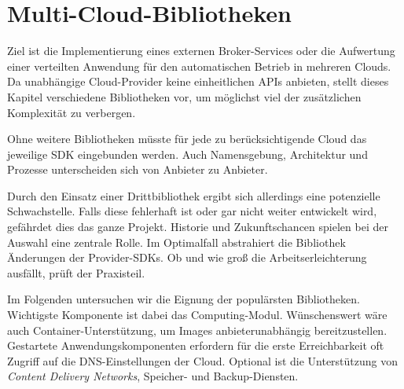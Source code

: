 \section{Multi-Cloud-Bibliotheken}
\label{sec:bibliotheken}

Ziel ist die Implementierung eines externen Broker-Services oder die Aufwertung einer verteilten Anwendung für den automatischen Betrieb in mehreren Clouds. Da unabhängige Cloud-Provider keine einheitlichen APIs anbieten, stellt dieses Kapitel verschiedene Bibliotheken vor, um möglichst viel der zusätzlichen Komplexität zu verbergen.

Ohne weitere Bibliotheken müsste für jede zu berücksichtigende Cloud das jeweilige SDK eingebunden werden. Auch Namensgebung, Architektur und Prozesse unterscheiden sich von Anbieter zu Anbieter. 

Durch den Einsatz einer Drittbibliothek ergibt sich allerdings eine potenzielle Schwachstelle. Falls diese fehlerhaft ist oder gar nicht weiter entwickelt wird, gefährdet dies das ganze Projekt. Historie und Zukunftschancen spielen bei der Auswahl eine zentrale Rolle. Im Optimalfall abstrahiert die Bibliothek Änderungen der Provider-SDKs. Ob und wie groß die Arbeitserleichterung ausfällt, prüft der Praxisteil.

Im Folgenden untersuchen wir die Eignung der populärsten Bibliotheken. Wichtigste Komponente ist dabei das Computing-Modul. Wünschenswert wäre auch Container-Unterstützung, um Images anbieterunabhängig bereitzustellen. Gestartete Anwendungskomponenten erfordern für die erste Erreichbarkeit oft Zugriff auf die DNS-Einstellungen der Cloud. Optional ist die Unterstützung von \emph{Content Delivery Networks}, Speicher- und Backup-Diensten.

